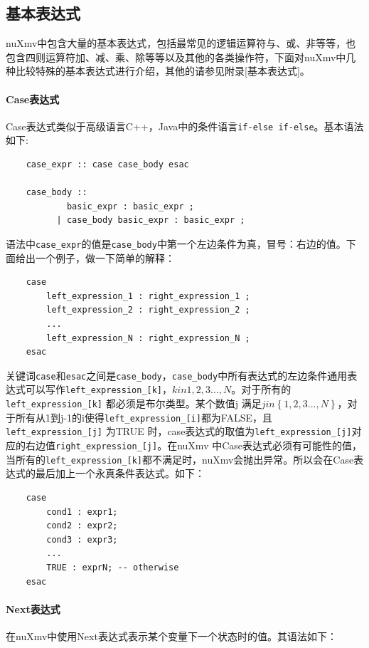 \subsection{基本表达式}
nuXmv中包含大量的基本表达式，包括最常见的逻辑运算符与、或、非等等，也包含四则运算符加、减、乘、除等等以及其他的各类操作符，下面对nuXmv中几种比较特殊的基本表达式进行介绍，其他的请参见附录[基本表达式]。

\paragraph{Case表达式}
Case表达式类似于高级语言C++，Java中的条件语言\verb|if-else if-else|。基本语法如下:

\begin{lstlisting}
    case_expr :: case case_body esac

    case_body ::
            basic_expr : basic_expr ;
          | case_body basic_expr : basic_expr ;
\end{lstlisting}

语法中\verb|case_expr|的值是\verb|case_body|中第一个左边条件为真，冒号：右边的值。下面给出一个例子，做一下简单的解释：

\begin{lstlisting}
    case
        left_expression_1 : right_expression_1 ;
        left_expression_2 : right_expression_2 ;
        ...
        left_expression_N : right_expression_N ;
    esac
\end{lstlisting}

关键词\verb|case|和\verb|esac|之间是\verb|case_body|，\verb|case_body|中所有表达式的左边条件通用表达式可以写作\verb|left_expression_[k]|，$k in {1,2,3...,N}$。对于所有的\verb|left_expression_[k]| 都必须是布尔类型。某个数值j 满足$ j in \left\{1,2,3...,N \right\}$，对于所有从1到j-1的i使得\verb|left_expression_[i]|都为FALSE，且\verb|left_expression_[j]| 为TRUE 时，case表达式的取值为\verb|left_expression_[j]|对应的右边值\verb|right_expression_[j]|。在nuXmv 中Case表达式必须有可能性的值，当所有的\verb|left_expression_[k]|都不满足时，nuXmv会抛出异常。所以会在Case表达式的最后加上一个永真条件表达式。如下：

\begin{lstlisting}
    case
        cond1 : expr1;
        cond2 : expr2;
        cond3 : expr3;
        ...
        TRUE : exprN; -- otherwise
    esac
\end{lstlisting}

\paragraph{Next表达式}
在nuXmv中使用Next表达式表示某个变量下一个状态时的值。其语法如下：

